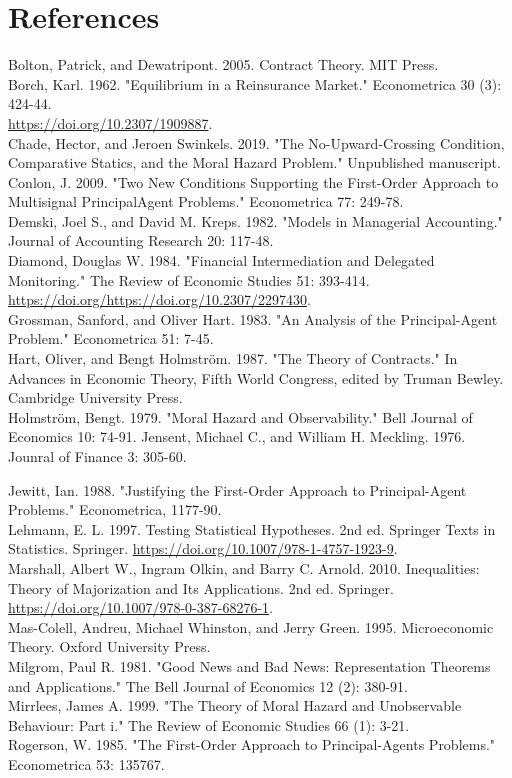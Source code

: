 \documentclass[10pt]{article}
\begin{document}
\section*{References}
Bolton, Patrick, and Dewatripont. 2005. Contract Theory. MIT Press.\\
Borch, Karl. 1962. "Equilibrium in a Reinsurance Market." Econometrica 30 (3): 424-44.\\
\href{https://doi.org/10.2307/1909887}{https://doi.org/10.2307/1909887}.\\
Chade, Hector, and Jeroen Swinkels. 2019. "The No-Upward-Crossing Condition, Comparative Statics, and the Moral Hazard Problem." Unpublished manuscript.\\
Conlon, J. 2009. "Two New Conditions Supporting the First-Order Approach to Multisignal PrincipalAgent Problems." Econometrica 77: 249-78.\\
Demski, Joel S., and David M. Kreps. 1982. "Models in Managerial Accounting." Journal of Accounting Research 20: 117-48.\\
Diamond, Douglas W. 1984. "Financial Intermediation and Delegated Monitoring." The Review of Economic Studies 51: 393-414. \href{https://doi.org/https://doi.org/10.2307/2297430}{https://doi.org/https://doi.org/10.2307/2297430}.\\
Grossman, Sanford, and Oliver Hart. 1983. "An Analysis of the Principal-Agent Problem." Econometrica 51: 7-45.\\
Hart, Oliver, and Bengt Holmström. 1987. "The Theory of Contracts." In Advances in Economic Theory, Fifth World Congress, edited by Truman Bewley. Cambridge University Press.\\
Holmström, Bengt. 1979. "Moral Hazard and Observability." Bell Journal of Economics 10: 74-91. Jensent, Michael C., and William H. Meckling. 1976. Jounral of Finance 3: 305-60.

Jewitt, Ian. 1988. "Justifying the First-Order Approach to Principal-Agent Problems." Econometrica, 1177-90.\\
Lehmann, E. L. 1997. Testing Statistical Hypotheses. 2nd ed. Springer Texts in Statistics. Springer. \href{https://doi.org/10.1007/978-1-4757-1923-9}{https://doi.org/10.1007/978-1-4757-1923-9}.\\
Marshall, Albert W., Ingram Olkin, and Barry C. Arnold. 2010. Inequalities: Theory of Majorization and Its Applications. 2nd ed. Springer. \href{https://doi.org/10.1007/978-0-387-68276-1}{https://doi.org/10.1007/978-0-387-68276-1}.\\
Mas-Colell, Andreu, Michael Whinston, and Jerry Green. 1995. Microeconomic Theory. Oxford University Press.\\
Milgrom, Paul R. 1981. "Good News and Bad News: Representation Theorems and Applications." The Bell Journal of Economics 12 (2): 380-91.\\
Mirrlees, James A. 1999. "The Theory of Moral Hazard and Unobservable Behaviour: Part i." The Review of Economic Studies 66 (1): 3-21.\\
Rogerson, W. 1985. "The First-Order Approach to Principal-Agents Problems." Econometrica 53: 135767.
\end{document}
